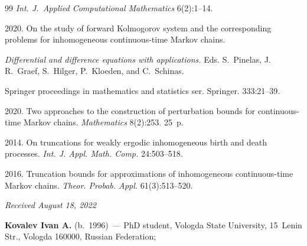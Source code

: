 {{\begin{thebibliography}{99}
\textit{Int. J.~Applied Computational Mathematics} 6(2):1--14.


 2020. On the study of forward Kolmogorov system and the corresponding problems for inhomogeneous continuous-time Markov chains.

\textit{Differential and difference equations with applications.} Eds. S.~Pinelas, J.\,R.~Graef, S.~Hilger, P.~Kloeden, and C.~Schinas. 

Springer proceedings in mathematics and statistics ser. Springer. 333:21--39.



 2020. Two approaches to the construction of perturbation bounds for continuous-time Markov chains. \textit{Mathematics} 8(2):253. 25~p.



 2014. On truncations for weakly ergodic inhomogeneous birth and death processes. \textit{Int. J. Appl. Math. Comp.} 24:503--518.



 2016. Truncation bounds for approximations of inhomogeneous continuous-time Markov chains. \textit{Theor. Probab. Appl.} 61(3):513--520.

  \end{thebibliography}

} }



\vspace*{-6pt}



\hfill{\small\textit{Received August 18, 2022}} 






\Contr





\noindent

\textbf{Kovalev Ivan A.} (b.\ 1996)~--- PhD student, Vologda State University, 15~Lenin Str., Vologda 160000, Russian Federation; 

